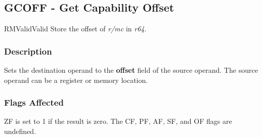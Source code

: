 \clearpage
{}
{}
\subsection*{GCOFF - Get Capability Offset}

\begin{x86opcodetable}
  {RM}{Valid}{Valid}
  {Store the offset of \emph{r/mc} in \emph{r64}.}
\end{x86opcodetable}

\begin{x86opentable}
\end{x86opentable}

\subsubsection*{Description}

Sets the destination operand to the \textbf{offset} field of the
source operand.  The source operand can be a register or memory
location.

\subsubsection*{Flags Affected}

ZF is set to 1 if the result is zero.  The CF, PF, AF, SF, and OF
flags are undefined.
